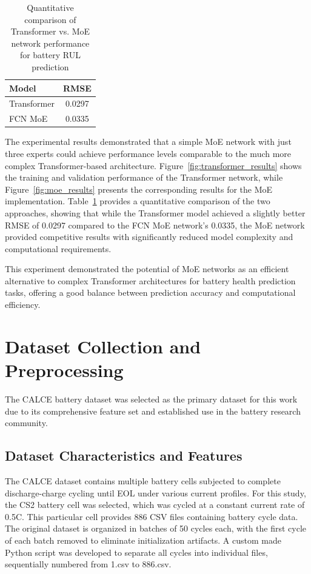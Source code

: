 \begin{table}[htbp]
    \centering
    \caption{Quantitative comparison of Transformer vs. MoE network performance for battery RUL prediction}
    \label{tab:transformer_moe_results}
    \begin{tabular}{lc}
        \hline
        \textbf{Model} & \textbf{RMSE} \\
        \hline
        Transformer & 0.0297 \\
        FCN MoE & 0.0335 \\
        \hline
    \end{tabular}
\end{table}

The experimental results demonstrated that a simple MoE network with just three experts could achieve performance levels comparable to the much more complex Transformer-based architecture. Figure~\ref{fig:transformer_results} shows the training and validation performance of the Transformer network, while Figure~\ref{fig:moe_results} presents the corresponding results for the MoE implementation. Table~\ref{tab:transformer_moe_results} provides a quantitative comparison of the two approaches, showing that while the Transformer model achieved a slightly better RMSE of 0.0297 compared to the FCN MoE network's 0.0335, the MoE network provided competitive results with significantly reduced model complexity and computational requirements.


This experiment demonstrated the potential of MoE networks as an efficient alternative to complex Transformer architectures for battery health prediction tasks, offering a good balance between prediction accuracy and computational efficiency.

\section{Dataset Collection and Preprocessing}
\label{sec:dataset_preprocessing}

The CALCE battery dataset was selected as the primary dataset for this work due to its comprehensive feature set and established use in the battery research community.

\subsection{Dataset Characteristics and Features}
\label{subsec:dataset_characteristics}

The CALCE dataset contains multiple battery cells subjected to complete discharge-charge cycling until EOL under various current profiles. For this study, the CS2 battery cell was selected, which was cycled at a constant current rate of 0.5C. This particular cell provides 886 CSV files containing battery cycle data. The original dataset is organized in batches of 50 cycles each, with the first cycle of each batch removed to eliminate initialization artifacts. A custom made Python script was developed to separate all cycles into individual files, sequentially numbered from 1.csv to 886.csv.

